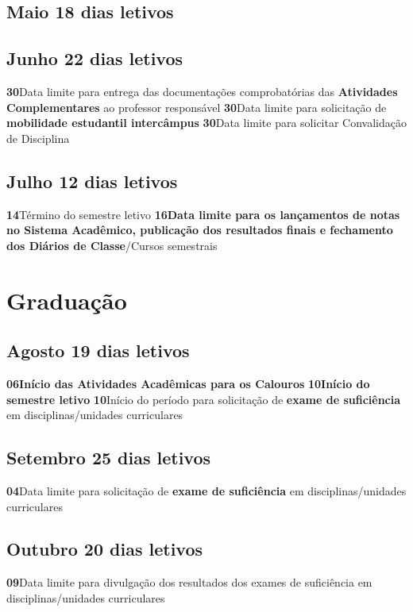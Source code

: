 \documentclass[thesis]{hmcposter}
\begin{document}
\begin{poster}
\subsection{Maio \hfill 18 dias letivos}\subsection{Junho \hfill 22 dias letivos}\textbf{30}\qquad Data limite para entrega das documentações comprobatórias das \textbf{Atividades Complementares} ao professor responsável \newline \null\textbf{30}\qquad Data limite para solicitação de \textbf{mobilidade estudantil intercâmpus} \newline \null\textbf{30}\qquad Data limite para solicitar Convalidação de Disciplina \newline \null\subsection{Julho \hfill 12 dias letivos}\textbf{14}\qquad Término do semestre letivo \newline \null\textbf{16}\qquad \textbf{Data limite para os lançamentos de notas no Sistema Acadêmico, publicação dos resultados finais e fechamento dos Diários de Classe}/Cursos semestrais \newline \null\newpage
\section{\color{hmcorange}Graduação}\subsection{Agosto \hfill 19 dias letivos}\textbf{06}\qquad \textbf{Início das Atividades Acadêmicas para os Calouros} \newline \null\textbf{10}\qquad \textbf{Início do semestre letivo} \newline \null\textbf{10}\qquad Início do período para solicitação de \textbf{exame de suficiência} em disciplinas/unidades curriculares \newline \null\subsection{Setembro \hfill 25 dias letivos}\textbf{04}\qquad Data limite para solicitação de \textbf{exame de suficiência} em disciplinas/unidades curriculares \newline \null\subsection{Outubro \hfill 20 dias letivos}\textbf{09}\qquad Data limite para divulgação dos resultados dos exames de suficiência em disciplinas/unidades curriculares \newline \null\vfill\null
\columnbreak

\end{poster}
\end{document}
